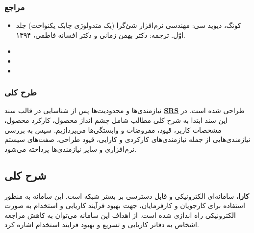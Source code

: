 \documentclass[12pt]{article}
\begin{document}
	\subsubsection{مراجع}
	\begin{itemize}
		\item
		کونگ، دیوید سی: مهندسی نرم‌افزار شئ‌گرا (یک متدولوژی چابک یکنواخت) جلد اوّل. ترجمه: دکتر بهمن زمانی و دکتر افسانه فاطمی، ۱۳۹۴.
		\item
		\item
		\item

	\end{itemize}

	\subsubsection{طرح کلی}
	نیازمندی‌ها و محدودیت‌ها پس از شناسایی در قالب سند
	\textbf{\hyperref[ref:srs]{SRS}}
	طراحی شده است. در این سند ابتدا به شرح کلی مطالب شامل چشم انداز محصول، کارکرد محصول، مشخصات کاربر، قیود، مفروضات و وابستگی‌ها می‌پردازیم. سپس به بررسی نیازمندی‌هایی از جمله نیازمندی‌های کارکردی و کارایی، قیود طراحی، صفت‌های سیستم نرم‌افزاری و سایر نیازمندی‌ها پرداخته می‌شود.

	\newpage
	\subsection{شرح کلی}
	\textbf{کارا}، سامانه‌ای الکترونیکی و قابل دسترسی بر بستر شبکه است. این سامانه به منظور استفاده برای کارجویان و کارفرمایان، جهت بهبود فرآیند کاریابی و استخدام به صورت الکترونیکی راه اندازی شده است. از اهداف این سامانه می‌توان به کاهش مراجعه اشخاص به دفاتر کاریابی و تسریع و بهبود فرایند استخدام اشاره کرد.
\end{document}
